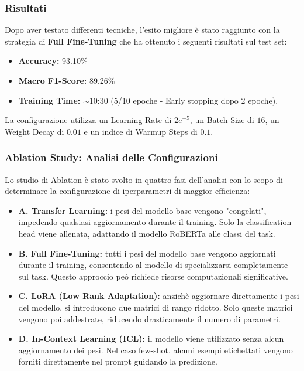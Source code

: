 \documentclass[a4paper,12pt]{article}
\begin{document}
\subsubsection{Risultati}
Dopo aver testato differenti tecniche, l'esito migliore è stato raggiunto con la strategia di \textbf{Full Fine-Tuning} che ha ottenuto i seguenti risultati sul test set:
\begin{itemize}
    \item \textbf{Accuracy:} 93.10\%
    \item \textbf{Macro F1-Score:} 89.26\%
    \item \textbf{Training Time:} $\sim$10:30 (5/10 epoche - Early stopping dopo 2 epoche).
\end{itemize}

La configurazione utilizza un Learning Rate di $2e^{-5}$, un Batch Size di $16$, un Weight Decay di $0.01$ e un indice di Warmup Steps di $0.1$.

\subsubsection{Ablation Study: Analisi delle Configurazioni}
Lo studio di Ablation è stato svolto in quattro fasi dell'analisi con lo scopo di determinare la configurazione di iperparametri di maggior efficienza:
\begin{itemize}
    \item \textbf{A. Transfer Learning:} i pesi del modello base vengono "congelati", impedendo qualsiasi aggiornamento durante il training. Solo la classification head viene allenata, adattando il modello RoBERTa alle classi del task.
    \item \textbf{B. Full Fine-Tuning:} tutti i pesi del modello base vengono aggiornati durante il training, consentendo al modello di specializzarsi completamente sul task. Questo approccio peò richiede risorse computazionali significative.
    \item \textbf{C. LoRA (Low Rank Adaptation):} anzichè aggiornare direttamente i pesi del modello, si introducono due matrici di rango ridotto. Solo queste matrici vengono poi addestrate, riducendo drasticamente il numero di parametri.
    \item \textbf{D. In-Context Learning (ICL):} il modello viene utilizzato senza alcun aggiornamento dei pesi. Nel caso few-shot, alcuni esempi etichettati vengono forniti direttamente nel prompt guidando la predizione.
\end{itemize}
\end{document}
